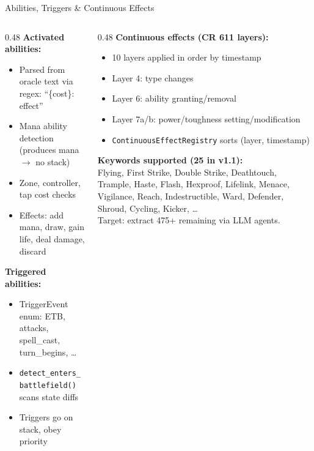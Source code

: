 \documentclass[aspectratio=169, 10pt]{beamer}
\begin{document}
\begin{frame}{Abilities, Triggers \& Continuous Effects}
  \begin{columns}[T]
    \begin{column}{0.48\textwidth}
      \footnotesize
      \textbf{Activated abilities:}
      \begin{itemize}\scriptsize
        \item Parsed from oracle text via regex: ``\{cost\}: effect''
        \item Mana ability detection (produces mana $\to$ no stack)
        \item Zone, controller, tap cost checks
        \item Effects: add mana, draw, gain life, deal damage, discard
      \end{itemize}
      \vspace{0.15cm}
      \textbf{Triggered abilities:}
      \begin{itemize}\scriptsize
        \item TriggerEvent enum: ETB, attacks, spell\_cast, turn\_begins, \ldots
        \item \texttt{detect\_enters\_battlefield()} scans state diffs
        \item Triggers go on stack, obey priority
      \end{itemize}
    \end{column}
    \begin{column}{0.48\textwidth}
      \footnotesize
      \textbf{Continuous effects (CR 611 layers):}
      \begin{itemize}\scriptsize
        \item 10 layers applied in order by timestamp
        \item Layer 4: type changes
        \item Layer 6: ability granting/removal
        \item Layer 7a/b: power/toughness setting/modification
        \item \texttt{ContinuousEffectRegistry} sorts (layer, timestamp)
      \end{itemize}
      \vspace{0.15cm}
      \textbf{Keywords supported (25 in v1.1):}\\
      {\scriptsize Flying, First Strike, Double Strike, Deathtouch, Trample,
       Haste, Flash, Hexproof, Lifelink, Menace, Vigilance, Reach,
       Indestructible, Ward, Defender, Shroud, Cycling, Kicker, \ldots}\\
      {\scriptsize Target: extract 475+ remaining via LLM agents.}
    \end{column}
  \end{columns}
\end{frame}
\end{document}
